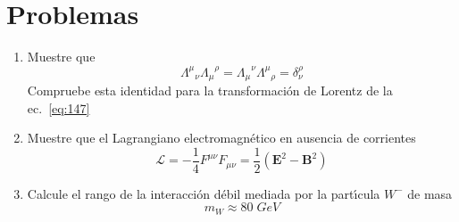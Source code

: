 \section{Problemas}
\label{sec:problemas2}
\renewcommand{\labelenumi}{\thechapter.\theenumi} %

\begin{enumerate} %
\item Muestre que
  \begin{equation*}
    {\Lambda^{\mu}}_{\nu}{\Lambda_\mu}^{\rho}={\Lambda_{\mu}}^{\nu}{\Lambda^{\mu}}_{\rho}=\delta^\rho_\nu
  \end{equation*}
Compruebe esta identidad para la transformaci\'on de Lorentz de la ec.~\eqref{eq:147}
\label{item:pch2.1} %

\item Muestre que el Lagrangiano electromagn\'etico en ausencia de corrientes
  \begin{equation}
    \mathcal{L}=-\frac{1}{4}F^{\mu\nu}F_{\mu\nu}=\frac{1}{2}\left(\mathbf{E}^2-\mathbf{B}^2\right)
  \end{equation}
\label{item:pch2.2} %

\item Calcule el rango de la interacci\'on d\'ebil mediada por la part\'\i cula $W^{-}$ de masa
  \begin{equation}
    m_W\approx80\;GeV
  \end{equation}
\label{item:pch2.3} %
\end{enumerate} %
\renewcommand{\labelenumi}{\theenumi} %






